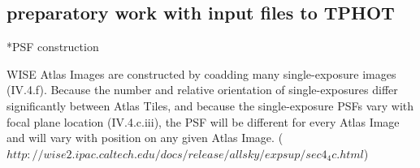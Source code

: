 \documentclass[numberedappendix,apj,twocolumn]{emulateapj}
\begin{document}


\subsection{preparatory work with input files to TPHOT} 
	
*PSF construction

WISE Atlas Images are constructed by coadding many single-exposure images (IV.4.f). Because the number and relative orientation of single-exposures differ significantly between Atlas Tiles, and because the single-exposure PSFs vary with focal plane location (IV.4.c.iii), the PSF will be different for every Atlas Image and will vary with position on any given Atlas Image. ($http://wise2.ipac.caltech.edu/docs/release/allsky/expsup/sec4_4c.html$)
\end{document}
